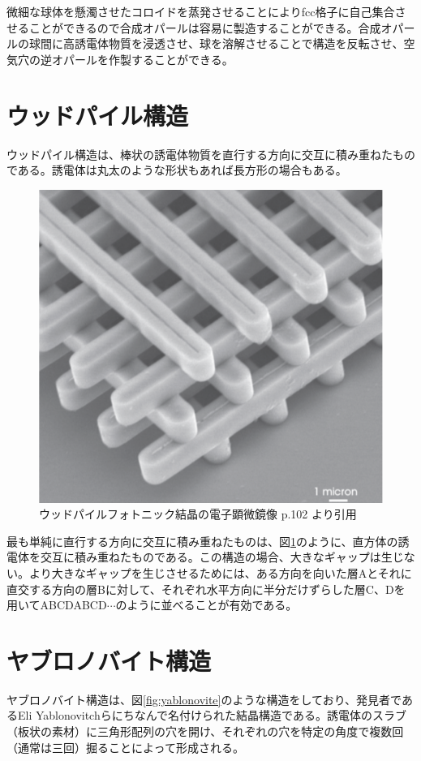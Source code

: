 \documentclass[platex,dvipdfmx,draft]{jsreport}
\numberwithin{equation}{section}
\begin{document}
微細な球体を懸濁させたコロイドを蒸発させることによりfcc格子に自己集合させることができるので合成オパールは容易に製造することができる。合成オパールの球間に高誘電体物質を浸透させ、球を溶解させることで構造を反転させ、空気穴の逆オパールを作製することができる。

\section{ウッドパイル構造}
ウッドパイル構造は、棒状の誘電体物質を直行する方向に交互に積み重ねたものである。誘電体は丸太のような形状もあれば長方形の場合もある。
\begin{figure}[htbp]
  \centering
  \includegraphics[width=0.6\linewidth]{woodpile.png}
  \caption{ウッドパイルフォトニック結晶の電子顕微鏡像 \cite{text} p.102 より引用}
  \label{fig:woodpile}

\end{figure}
最も単純に直行する方向に交互に積み重ねたものは、図\ref{fig:woodpile}のように、直方体の誘電体を交互に積み重ねたものである。この構造の場合、大きなギャップは生じない。より大きなギャップを生じさせるためには、ある方向を向いた層Aとそれに直交する方向の層Bに対して、それぞれ水平方向に半分だけずらした層C、Dを用いてABCDABCD$\cdots$のように並べることが有効である。

\section{ヤブロノバイト構造}
ヤブロノバイト構造は、図\ref{fig:yablonovite}のような構造をしており、発見者であるEli Yablonovitchらにちなんで名付けられた結晶構造である。誘電体のスラブ（板状の素材）に三角形配列の穴を開け、それぞれの穴を特定の角度で複数回（通常は三回）掘ることによって形成される。
\end{document}
